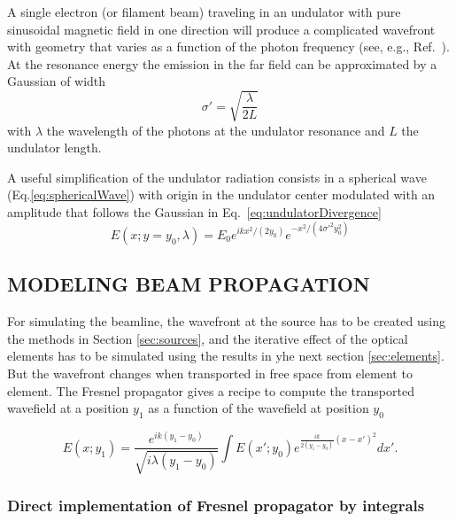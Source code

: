 \documentclass[]{spie}  %
\begin{document}
A single electron (or filament beam) traveling in an undulator with pure sinusoidal magnetic field in one direction will produce a complicated wavefront with geometry that varies as a function of the photon frequency (see, e.g., Ref.~\cite{elleaume}). At the resonance energy the emission in the far field can be approximated by a Gaussian of width \cite{elleaume}
\begin{equation}
\label{eq:undulatorDivergence}
    \sigma' = \sqrt{\frac{\lambda}{2 L}}
\end{equation}
with $\lambda$ the wavelength of the photons at the undulator resonance and $L$ the undulator length. 

A useful simplification of the undulator radiation consists in a spherical wave (Eq.\ref{eq:sphericalWave}) with origin in the undulator center modulated with an amplitude that follows the Gaussian in Eq.~\ref{eq:undulatorDivergence}
\begin{equation}
    E(x;y=y_0,\lambda) = E_0 e^{i k x^2 / (2 y_0)} e^{-x^2/(4 \sigma'^2 y_0^2)}
\end{equation}



\subsection{MODELING BEAM PROPAGATION}
\label{sec:propagation}

For simulating the beamline, the wavefront at the source has to be created using the methods in Section \ref{sec:sources}, and the iterative effect of the optical elements has to be simulated using the results in yhe next section \ref{sec:elements}. But the wavefront changes when transported in free space from element to element. The Fresnel propagator \cite{goodmanfourier} gives a recipe to compute the transported wavefield at a position $y_1$ as a function of the wavefield at position $y_0$

\begin{equation}\label{eq:fresnelPropagator}
E(x;y_1) =  \frac{e^{i k (y_1-y_0)}}{\sqrt{i \lambda (y_1-y_0)}} \int E(x';y_0) e^{ \frac{i k}{2 (y_1-y_0)}  (x-x')^2  }  dx'.
\end{equation}

\subsubsection{Direct implementation of Fresnel propagator by integrals}
\label{sec:integralPropagator}
\end{document}
